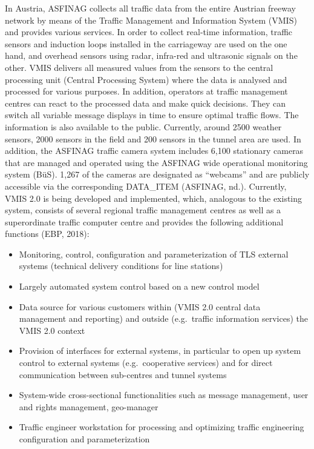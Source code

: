 \documentclass[
]{book}
\providecommand{\tightlist}{%
  \setlength{\itemsep}{0pt}\setlength{\parskip}{0pt}}
\begin{document}
In Austria, ASFINAG collects all traffic data from the entire Austrian freeway network by means of the Traffic Management and Information System (VMIS) and provides various services. In order to collect real-time information, traffic sensors and induction loops installed in the carriageway are used on the one hand, and overhead sensors using radar, infra-red and ultrasonic signals on the other. VMIS delivers all measured values from the sensors to the central processing unit (Central Processing System) where the data is analysed and processed for various purposes. In addition, operators at traffic management centres can react to the processed data and make quick decisions. They can switch all variable message displays in time to ensure optimal traffic flows. The information is also available to the public. Currently, around 2500 weather sensors, 2000 sensors in the field and 200 sensors in the tunnel area are used. In addition, the ASFINAG traffic camera system includes 6,100 stationary cameras that are managed and operated using the ASFINAG wide operational monitoring system (BüS). 1,267 of the cameras are designated as ``webcams'' and are publicly accessible via the corresponding DATA\_ITEM (ASFINAG, nd.). Currently, VMIS 2.0 is being developed and implemented, which, analogous to the existing system, consists of several regional traffic management centres as well as a superordinate traffic computer centre and provides the following additional functions (EBP, 2018):

\begin{itemize}
\tightlist
\item
  Monitoring, control, configuration and parameterization of TLS external systems (technical delivery conditions for line stations)
\item
  Largely automated system control based on a new control model
\item
  Data source for various customers within (VMIS 2.0 central data management and reporting) and outside (e.g.~traffic information services) the VMIS 2.0 context
\item
  Provision of interfaces for external systems, in particular to open up system control to external systems (e.g.~cooperative services) and for direct communication between sub-centres and tunnel systems
\item
  System-wide cross-sectional functionalities such as message management, user and rights management, geo-manager
\item
  Traffic engineer workstation for processing and optimizing traffic engineering configuration and parameterization
\end{itemize}
\end{document}
